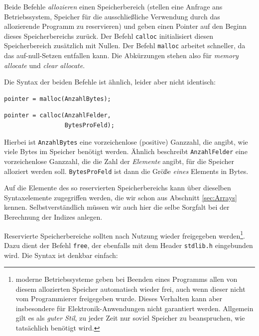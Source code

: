 Beide Befehle \emph{allozieren} einen Speicherbereich (\ie stellen eine Anfrage ans Betriebssystem, Speicher für die ausschließliche Verwendung durch das allozierende Programm zu reservieren) und geben einen Pointer auf den Beginn dieses Speicherbereichs zurück. Der Befehl \texttt{calloc} initialisiert diesen Speicherbereich zusätzlich mit Nullen. Der Befehl \texttt{malloc} arbeitet schneller, da das auf-null-Setzen entfallen kann. Die Abkürzungen stehen also für \emph{memory allocate} und \emph{clear allocate}.

Die Syntax der beiden Befehle ist ähnlich, leider aber nicht identisch:
\begin{tcbraster}[raster columns=2,
                  raster equal height,
                  nobeforeafter,
                  raster column skip=0.5cm]
\begin{codebox}
\begin{verbatim}
pointer = malloc(AnzahlBytes);
\end{verbatim}
\end{codebox}
%
\begin{codebox}
\begin{verbatim}
pointer = calloc(AnzahlFelder, 
                 BytesProFeld);
\end{verbatim}
\end{codebox}
\end{tcbraster}

Hierbei ist \texttt{AnzahlBytes} eine vorzeichenlose (\ie positive) Ganzzahl, die angibt, wie viele Bytes im Speicher benötigt werden. Ähnlich beschreibt \texttt{AnzahlFelder} eine vorzeichenlose Ganzzahl, die die Zahl der \emph{Elemente} angibt, für die Speicher alloziert werden soll. \texttt{BytesProFeld} ist dann die Größe \emph{eines} Elements in Bytes.

Auf die Elemente des so reservierten Speicherbereichs kann über dieselben Syntaxelemente zugegriffen werden, die wir schon aus Abschnitt \ref{sec:Arrays} kennen. Selbstverständlich müssen wir auch hier die selbe Sorgfalt bei der Berechnung der Indizes anlegen.

Reservierte Speicherbereiche sollten nach Nutzung wieder freigegeben werden\footnote{moderne Betriebssysteme geben bei Beenden eines Programms allen von diesem allozierten Speicher automatisch wieder frei, auch wenn dieser nicht vom Programmierer freigegeben wurde. Dieses Verhalten kann aber insbesondere für Elektronik-Anwendungen nicht garantiert werden. Allgemein gilt es als \emph{guter Stil}, zu jeder Zeit nur soviel Speicher zu beanspruchen, wie tatsächlich benötigt wird.}. Dazu dient der Befehl \texttt{free}, der ebenfalls mit dem Header \texttt{stdlib.h} eingebunden wird. Die Syntax ist denkbar einfach:

